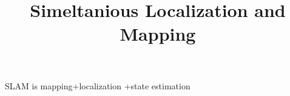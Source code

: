 \documentclass[a4paper]{article}
\title{Simeltanious Localization and Mapping}
\date{}
\begin{document}
    \maketitle
    SLAM is mapping+localization +state estimation
\end{document}
